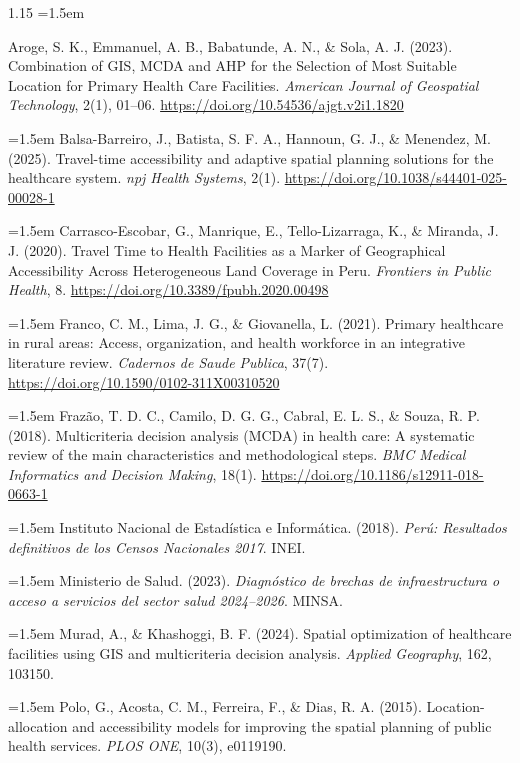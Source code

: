 \documentclass[12pt,a4paper,oneside]{article}
\begin{document}
\begin{spacing}{1.15}
\setlength{\parindent}{0pt}
\setlength{\parskip}{0.6em}
\hangindent=1.5em

Aroge, S. K., Emmanuel, A. B., Babatunde, A. N., \& Sola, A. J. (2023). Combination of GIS, MCDA and AHP for the Selection of Most Suitable Location for Primary Health Care Facilities. \textit{American Journal of Geospatial Technology}, 2(1), 01--06. \url{https://doi.org/10.54536/ajgt.v2i1.1820}

\hangindent=1.5em
Balsa-Barreiro, J., Batista, S. F. A., Hannoun, G. J., \& Menendez, M. (2025). Travel-time accessibility and adaptive spatial planning solutions for the healthcare system. \textit{npj Health Systems}, 2(1). \url{https://doi.org/10.1038/s44401-025-00028-1}

\hangindent=1.5em
Carrasco-Escobar, G., Manrique, E., Tello-Lizarraga, K., \& Miranda, J. J. (2020). Travel Time to Health Facilities as a Marker of Geographical Accessibility Across Heterogeneous Land Coverage in Peru. \textit{Frontiers in Public Health}, 8. \url{https://doi.org/10.3389/fpubh.2020.00498}

\hangindent=1.5em
Franco, C. M., Lima, J. G., \& Giovanella, L. (2021). Primary healthcare in rural areas: Access, organization, and health workforce in an integrative literature review. \textit{Cadernos de Saude Publica}, 37(7). \url{https://doi.org/10.1590/0102-311X00310520}

\hangindent=1.5em
Frazão, T. D. C., Camilo, D. G. G., Cabral, E. L. S., \& Souza, R. P. (2018). Multicriteria decision analysis (MCDA) in health care: A systematic review of the main characteristics and methodological steps. \textit{BMC Medical Informatics and Decision Making}, 18(1). \url{https://doi.org/10.1186/s12911-018-0663-1}

\hangindent=1.5em
Instituto Nacional de Estadística e Informática. (2018). \textit{Perú: Resultados definitivos de los Censos Nacionales 2017}. INEI.

\hangindent=1.5em
Ministerio de Salud. (2023). \textit{Diagnóstico de brechas de infraestructura o acceso a servicios del sector salud 2024–2026}. MINSA.

\hangindent=1.5em
Murad, A., \& Khashoggi, B. F. (2024). Spatial optimization of healthcare facilities using GIS and multicriteria decision analysis. \textit{Applied Geography}, 162, 103150.

\hangindent=1.5em
Polo, G., Acosta, C. M., Ferreira, F., \& Dias, R. A. (2015). Location-allocation and accessibility models for improving the spatial planning of public health services. \textit{PLOS ONE}, 10(3), e0119190.


\end{spacing}
\end{document}
